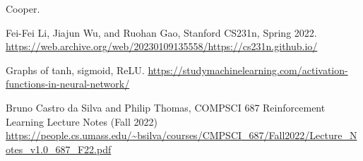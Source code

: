 \documentclass[11pt]{article}
\numberwithin{equation}{section}
\theoremstyle{definition}%
\begin{document}
\begin{thebibliography}{2}
     Cooper.

     Fei-Fei Li, Jiajun Wu, and Ruohan Gao, Stanford CS231n, Spring 2022. \url{https://web.archive.org/web/20230109135558/https://cs231n.github.io/}

     Graphs of tanh, sigmoid, ReLU. \url{https://studymachinelearning.com/activation-functions-in-neural-network/}

     Bruno Castro da Silva and Philip Thomas, COMPSCI 687 Reinforcement Learning Lecture Notes (Fall 2022) \url{https://people.cs.umass.edu/~bsilva/courses/CMPSCI_687/Fall2022/Lecture_Notes_v1.0_687_F22.pdf}

\end{thebibliography}
\end{document}
